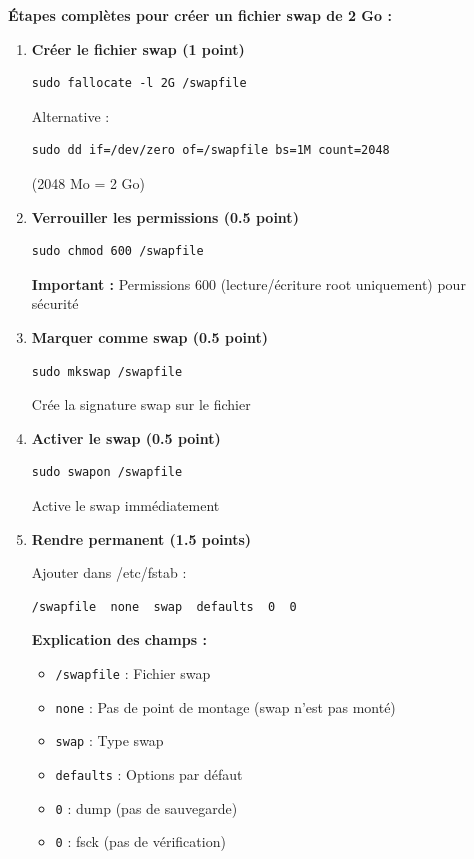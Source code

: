 \documentclass[12pt,a4paper]{article}
\begin{document}
\begin{answerbox}
\textbf{Étapes complètes pour créer un fichier swap de 2 Go :}

\begin{enumerate}
    \item \textbf{Créer le fichier swap (1 point)}
    \begin{lstlisting}
sudo fallocate -l 2G /swapfile
    \end{lstlisting}
    
    Alternative :
    \begin{lstlisting}
sudo dd if=/dev/zero of=/swapfile bs=1M count=2048
    \end{lstlisting}
    (2048 Mo = 2 Go)
    
    \item \textbf{Verrouiller les permissions (0.5 point)}
    \begin{lstlisting}
sudo chmod 600 /swapfile
    \end{lstlisting}
    
    \textbf{Important :} Permissions 600 (lecture/écriture root uniquement) pour sécurité
    
    \item \textbf{Marquer comme swap (0.5 point)}
    \begin{lstlisting}
sudo mkswap /swapfile
    \end{lstlisting}
    
    Crée la signature swap sur le fichier
    
    \item \textbf{Activer le swap (0.5 point)}
    \begin{lstlisting}
sudo swapon /swapfile
    \end{lstlisting}
    
    Active le swap immédiatement
    
    \item \textbf{Rendre permanent (1.5 points)}
    
    Ajouter dans /etc/fstab :
    \begin{verbatim}
/swapfile  none  swap  defaults  0  0
    \end{verbatim}
    
    \textbf{Explication des champs :}
    \begin{itemize}
        \item \texttt{/swapfile} : Fichier swap
        \item \texttt{none} : Pas de point de montage (swap n'est pas monté)
        \item \texttt{swap} : Type swap
        \item \texttt{defaults} : Options par défaut
        \item \texttt{0} : dump (pas de sauvegarde)
        \item \texttt{0} : fsck (pas de vérification)
    \end{itemize}
    

\end{enumerate}
\end{answerbox}
\end{document}
